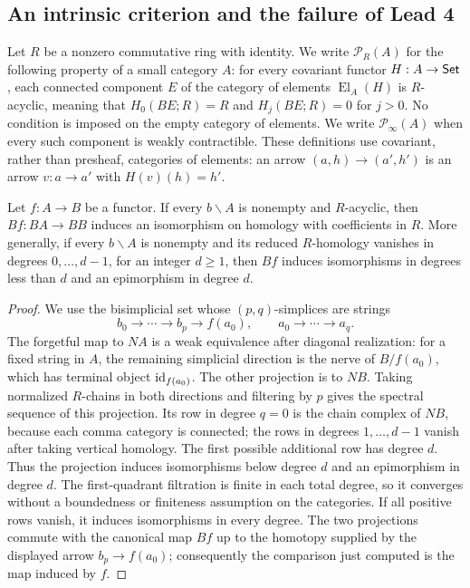 \subsection{An intrinsic criterion and the failure of Lead 4}

\begin{definition}\label{C:action-definition}
Let $R$ be a nonzero commutative ring with identity. We write $\mathcal P_R(A)$ for the following property of a small category $A$: for every covariant functor $H:A\to\mathsf{Set}$, each connected component $E$ of the category of elements $\operatorname{El}_A(H)$ is $R$-acyclic, meaning that $H_0(BE;R)=R$ and $H_j(BE;R)=0$ for $j>0$. No condition is imposed on the empty category of elements. We write $\mathcal P_\infty(A)$ when every such component is weakly contractible. These definitions use covariant, rather than presheaf, categories of elements: an arrow $(a,h)\to(a',h')$ is an arrow $v:a\to a'$ with $H(v)(h)=h'$.
\end{definition}

\begin{lemma}\label{C:homology-A}
Let $f:A\to B$ be a functor. If every $b\backslash A$ is nonempty and $R$-acyclic, then $Bf:BA\to BB$ induces an isomorphism on homology with coefficients in $R$. More generally, if every $b\backslash A$ is nonempty and its reduced $R$-homology vanishes in degrees $0,\ldots,d-1$, for an integer $d\geq1$, then $Bf$ induces isomorphisms in degrees less than $d$ and an epimorphism in degree $d$.
\end{lemma}
\begin{proof}
We use the bisimplicial set whose $(p,q)$-simplices are strings
\[
 b_0\longrightarrow\cdots\longrightarrow b_p
 \longrightarrow f(a_0),\qquad
 a_0\longrightarrow\cdots\longrightarrow a_q.
\]
The forgetful map to $NA$ is a weak equivalence after diagonal realization: for a fixed string in $A$, the remaining simplicial direction is the nerve of $B/f(a_0)$, which has terminal object $\mathrm{id}_{f(a_0)}$. The other projection is to $NB$. Taking normalized $R$-chains in both directions and filtering by $p$ gives the spectral sequence of this projection. Its row in degree $q=0$ is the chain complex of $NB$, because each comma category is connected; the rows in degrees $1,\ldots,d-1$ vanish after taking vertical homology. The first possible additional row has degree $d$. Thus the projection induces isomorphisms below degree $d$ and an epimorphism in degree $d$. The first-quadrant filtration is finite in each total degree, so it converges without a boundedness or finiteness assumption on the categories. If all positive rows vanish, it induces isomorphisms in every degree. The two projections commute with the canonical map $Bf$ up to the homotopy supplied by the displayed arrow $b_p\to f(a_0)$; consequently the comparison just computed is the map induced by $f$.
\end{proof}

